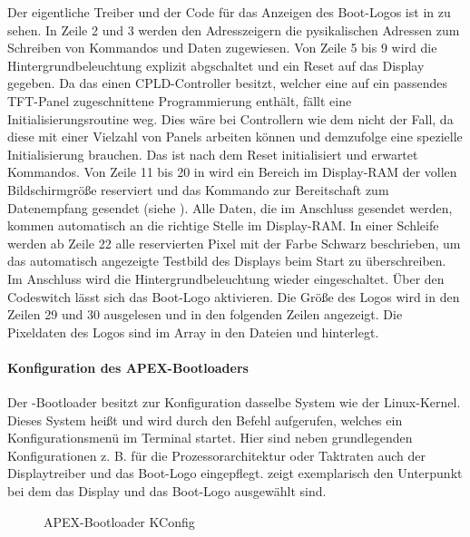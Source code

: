 Der eigentliche Treiber und der Code für das Anzeigen des Boot-Logos ist in  zu sehen. In Zeile 2 und 3 werden den Adresszeigern die pysikalischen Adressen zum Schreiben von Kommandos und Daten zugewiesen. Von Zeile 5 bis 9 wird die Hintergrundbeleuchtung explizit abgschaltet und ein Reset auf das Display gegeben. Da das  einen CPLD-Controller besitzt, welcher eine auf ein passendes TFT-Panel zugeschnittene Programmierung enthält, fällt eine Initialisierungsroutine weg. Dies wäre bei Controllern wie dem  nicht der Fall, da diese mit einer Vielzahl von Panels arbeiten können und demzufolge eine spezielle Initialisierung brauchen. Das  ist nach dem Reset initialisiert und erwartet Kommandos. Von Zeile 11 bis 20 in  wird ein Bereich im Display-RAM der vollen Bildschirmgröße reserviert und das Kommando zur Bereitschaft zum Datenempfang gesendet (siehe ). Alle Daten, die im Anschluss gesendet werden, kommen automatisch an die richtige Stelle im Display-RAM. In einer Schleife werden ab Zeile 22 alle reservierten Pixel mit der Farbe Schwarz beschrieben, um das automatisch angezeigte Testbild des Displays beim Start zu überschreiben. Im Anschluss wird die Hintergrundbeleuchtung wieder eingeschaltet. Über den Codeswitch  lässt sich das Boot-Logo aktivieren. Die Größe des Logos wird in den Zeilen 29 und 30 ausgelesen und in den folgenden Zeilen angezeigt. Die Pixeldaten des Logos sind im Array  in den Dateien  und  hinterlegt.


\paragraph{Konfiguration des APEX-Bootloaders}
\label{cha:config_apex}
Der -Bootloader besitzt zur Konfiguration dasselbe System wie der Linux-Kernel. Dieses System heißt  und wird durch den Befehl  aufgerufen, welches ein Konfigurationsmenü im Terminal startet. Hier sind neben grundlegenden Konfigurationen z. B. für die Prozessorarchitektur oder Taktraten auch der Displaytreiber und das Boot-Logo eingepflegt.  zeigt exemplarisch den Unterpunkt  bei dem das Display  und das Boot-Logo ausgewählt sind. 

\begin{figure}[tbph]
	\centering
{}
	\caption{APEX-Bootloader KConfig}
	\label{fig:apex_config}
\end{figure}
\newpage

